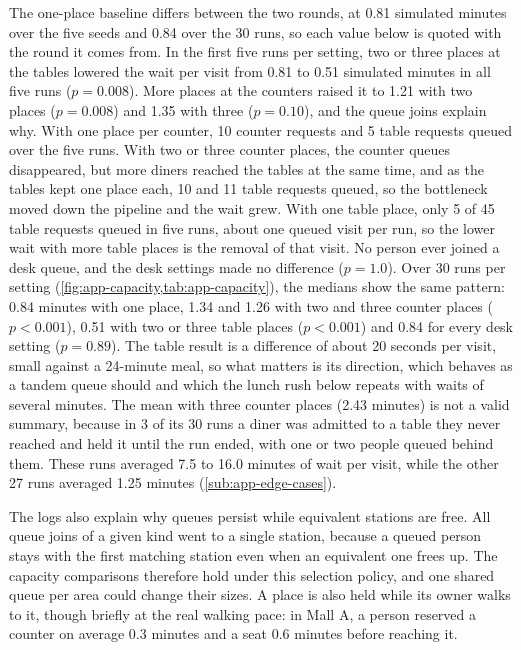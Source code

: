 The one-place baseline differs between the two rounds, at 0.81 simulated minutes over the five seeds and 0.84 over the 30 runs, so each value below is quoted with the round it comes from. In the first five runs per setting, two or three places at the tables lowered the wait per visit from 0.81 to 0.51 simulated minutes in all five runs ($p=0.008$). More places at the counters raised it to 1.21 with two places ($p=0.008$) and 1.35 with three ($p=0.10$), and the queue joins explain why. With one place per counter, 10 counter requests and 5 table requests queued over the five runs. With two or three counter places, the counter queues disappeared, but more diners reached the tables at the same time, and as the tables kept one place each, 10 and 11 table requests queued, so the bottleneck moved down the pipeline and the wait grew. With one table place, only 5 of 45 table requests queued in five runs, about one queued visit per run, so the lower wait with more table places is the removal of that visit. No person ever joined a desk queue, and the desk settings made no difference ($p=1.0$). Over 30 runs per setting (\cref{fig:app-capacity,tab:app-capacity}), the medians show the same pattern: 0.84 minutes with one place, 1.34 and 1.26 with two and three counter places ($p<0.001$), 0.51 with two or three table places ($p<0.001$) and 0.84 for every desk setting ($p=0.89$). The table result is a difference of about 20 seconds per visit, small against a 24-minute meal, so what matters is its direction, which behaves as a tandem queue should and which the lunch rush below repeats with waits of several minutes. The mean with three counter places (2.43 minutes) is not a valid summary, because in 3 of its 30 runs a diner was admitted to a table they never reached and held it until the run ended, with one or two people queued behind them. These runs averaged 7.5 to 16.0 minutes of wait per visit, while the other 27 runs averaged 1.25 minutes (\cref{sub:app-edge-cases}).

The logs also explain why queues persist while equivalent stations are free. All queue joins of a given kind went to a single station, because a queued person stays with the first matching station even when an equivalent one frees up. The capacity comparisons therefore hold under this selection policy, and one shared queue per area could change their sizes. A place is also held while its owner walks to it, though briefly at the real walking pace: in Mall A, a person reserved a counter on average 0.3 minutes and a seat 0.6 minutes before reaching it.

